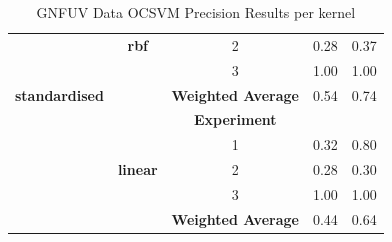 \documentclass{mpaper}
\begin{document}
\begin{table}[]
\begin{tabular}{|c|c|ccc|}
                            & \textbf{rbf}    & \multicolumn{1}{c|}{2}                         & 0.28             & 0.37              \\
                            &                 & \multicolumn{1}{c|}{3}                         & 1.00             & 1.00              \\ \cline{3-5} 
\textbf{standardised}       &                 & \multicolumn{1}{c|}{\textbf{Weighted Average}} & 0.54             & 0.74              \\ \cline{2-5} 
                            &                 & \multicolumn{1}{c|}{\textbf{Experiment}}       & \textbf{}        & \textbf{}         \\ \cline{3-5} 
                            &                 & \multicolumn{1}{c|}{1}                         & 0.32             & 0.80              \\
\multicolumn{1}{|l|}{}      & \textbf{linear} & \multicolumn{1}{c|}{2}                         & 0.28             & 0.30              \\
                            &                 & \multicolumn{1}{c|}{3}                         & 1.00             & 1.00              \\ \cline{3-5} 
                            &                 & \multicolumn{1}{c|}{\textbf{Weighted Average}} & 0.44             & 0.64              \\ \hline
\end{tabular}
\caption{\label{tab:gnfuv_ocsvm_precision_per_kernel} GNFUV Data OCSVM Precision Results per kernel}
\end{table}



\end{document}

